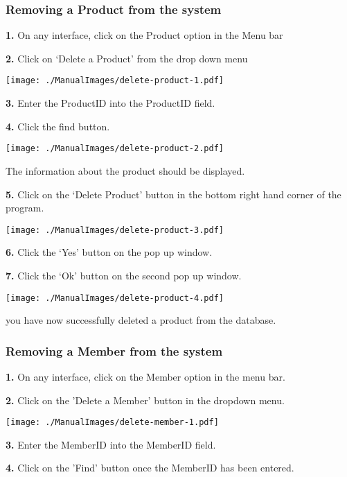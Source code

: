 \pagebreak
\subsubsection{Removing a Product from the system}
\label{fig:Removing a Product from the system}

\textbf{1.} On any interface, click on the Product option in the Menu bar

\textbf{2.} Click on `Delete a Product' from the drop down menu

\texttt{[image: ./ManualImages/delete-product-1.pdf]}

\textbf{3.} Enter the ProductID into the ProductID field.

\textbf{4.} Click the find button.

\texttt{[image: ./ManualImages/delete-product-2.pdf]}

The information about the product should be displayed.

\textbf{5.} Click on the `Delete Product' button in the bottom right hand corner of the program.

\texttt{[image: ./ManualImages/delete-product-3.pdf]}

\textbf{6.} Click the `Yes' button on the pop up window.

\textbf{7.} Click the `Ok' button on the second pop up window.

\texttt{[image: ./ManualImages/delete-product-4.pdf]}

you have now successfully deleted a product from the database.

\pagebreak
\subsubsection{Removing a Member from the system}
\label{fig:Removing a Member from the system}

\textbf{1.} On any interface, click on the Member option in the menu bar.

\textbf{2.} Click on the 'Delete a Member' button in the dropdown menu.

\texttt{[image: ./ManualImages/delete-member-1.pdf]}

\pagebreak

\textbf{3.} Enter the MemberID into the MemberID field.

\textbf{4.} Click on the 'Find' button once the MemberID has been entered.

